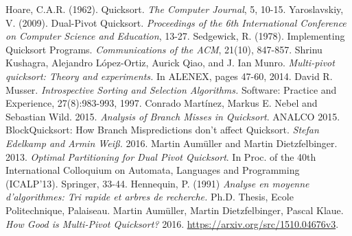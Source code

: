 \documentclass{article}
\begin{document}
\begin{thebibliography}{99}

 \label{HoareQuickSort} Hoare, C.A.R. (1962). Quicksort. \textit{The Computer Journal}, 5, 10-15.
 \label{Yaroslavskiy} Yaroslavskiy, V. (2009). Dual-Pivot Quicksort. \textit{Proceedings of the 6th International Conference on Computer Science and Education}, 13-27.
 \label{Sedgewick} Sedgewick, R. (1978). Implementing Quicksort Programs. \textit{Communications of the ACM}, 21(10), 847-857.
 \label{Kushagra} {Shrinu Kushagra, Alejandro López-Ortiz, Aurick Qiao, and J. Ian Munro. \textit{Multi-pivot quicksort: Theory and experiments.} In ALENEX, pages 47-60, 2014.}
 \label{Introsort} David R. Musser. \textit{Introspective Sorting and Selection Algorithms.} Software: Practice and Experience, 27(8):983-993, 1997.
 \label{AnalysisOfBranchMissesInQuickSort} Conrado Martínez, Markus E. Nebel and Sebastian Wild. 2015. \textit{Analysis of Branch Misses in Quicksort}. ANALCO 2015.
 \label{BlockQuickSort} BlockQuicksort: How Branch Mispredictions don't affect Quicksort. \textit{Stefan Edelkamp and Armin Weiß.} 2016.
 \label{OptimalPartitioningForDualPivotQuicksort} Martin Aumüller and Martin Dietzfelbinger. 2013. \textit{Optimal Partitioning for Dual Pivot Quicksort}. In Proc.
of the 40th International Colloquium on Automata, Languages and Programming (ICALP'13). Springer, 33-44.
 \label{Hennequin} Hennequin, P. (1991) \textit{Analyse en moyenne d'algorithmes: Tri rapide et arbres de recherche.} Ph.D. Thesis, Ecole Politechnique, Palaiseau.
 \label{HowGoodIsMultiPivotQuicksort} Martin Aumüller, Martin Dietzfelbinger, Pascal Klaue. \textit{How Good is Multi-Pivot Quicksort?} 2016. \url{https://arxiv.org/src/1510.04676v3}.
\end{thebibliography}
\end{document}
